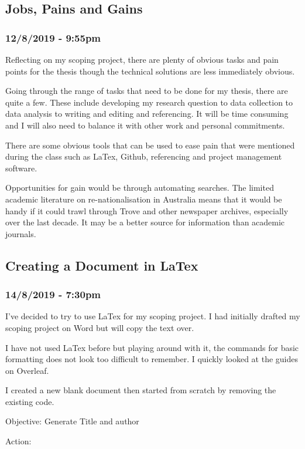 \documentclass{article}
\begin{document}
\subsection{Jobs, Pains and Gains }
\subsubsection*{12/8/2019 - 9:55pm}
Reflecting on my scoping project, there are plenty of obvious tasks and pain points for the thesis though the technical solutions are less immediately obvious.\par
Going through the range of tasks that need to be done for my thesis, there are quite a few. These include developing my research question to data collection to data analysis to writing and editing and referencing. It will be time consuming and I will also need to balance it with other work and personal commitments.\par
There are some obvious tools that can be used to ease pain that were mentioned during the class such as LaTex, Github, referencing and project management software.\par
Opportunities for gain would be through automating searches. The limited academic literature on re-nationalisation in Australia means that it would be handy if it could trawl through Trove and other newspaper archives, especially over the last decade. It may be a better source for information than academic journals.
\subsection{Creating a Document in LaTex}
\subsubsection*{14/8/2019 - 7:30pm}
I’ve decided to try to use LaTex for my scoping project. I had initially drafted my scoping project on Word but will copy the text over.\par
I have not used LaTex before but playing around with it, the commands for basic formatting does not look too difficult to remember. I quickly looked at the guides on Overleaf.\par
I created a new blank document then started from scratch by removing the existing code.\par
Objective: Generate Title and author\par
Action:
\end{document}

